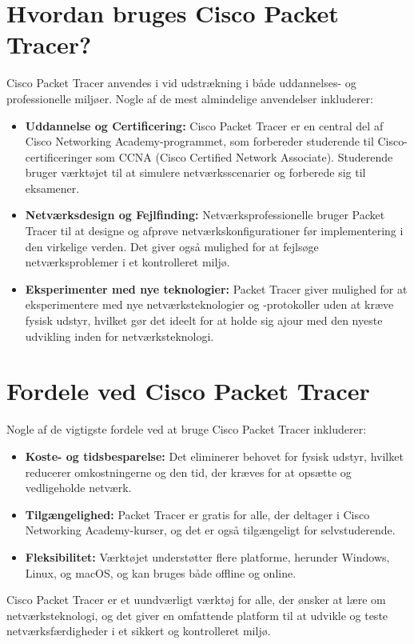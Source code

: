 \section*{Hvordan bruges Cisco Packet Tracer?}
Cisco Packet Tracer anvendes i vid udstrækning i både uddannelses- og professionelle miljøer. Nogle af de mest almindelige anvendelser inkluderer:
\begin{itemize}
	\item \textbf{Uddannelse og Certificering:} Cisco Packet Tracer er en central del af Cisco Networking Academy-programmet, som forbereder studerende til Cisco-certificeringer som CCNA (Cisco Certified Network Associate). Studerende bruger værktøjet til at simulere netværksscenarier og forberede sig til eksamener.
	\item \textbf{Netværksdesign og Fejlfinding:} Netværksprofessionelle bruger Packet Tracer til at designe og afprøve netværkskonfigurationer før implementering i den virkelige verden. Det giver også mulighed for at fejlsøge netværksproblemer i et kontrolleret miljø.
	\item \textbf{Eksperimenter med nye teknologier:} Packet Tracer giver mulighed for at eksperimentere med nye netværksteknologier og -protokoller uden at kræve fysisk udstyr, hvilket gør det ideelt for at holde sig ajour med den nyeste udvikling inden for netværksteknologi.
\end{itemize}

\section*{Fordele ved Cisco Packet Tracer}
Nogle af de vigtigste fordele ved at bruge Cisco Packet Tracer inkluderer:

\begin{itemize}
	\item \textbf{Koste- og tidsbesparelse:} Det eliminerer behovet for fysisk udstyr, hvilket reducerer omkostningerne og den tid, der kræves for at opsætte og vedligeholde netværk.
	\item \textbf{Tilgængelighed:} Packet Tracer er gratis for alle, der deltager i Cisco Networking Academy-kurser, og det er også tilgængeligt for selvstuderende.
	\item \textbf{Fleksibilitet:} Værktøjet understøtter flere platforme, herunder Windows, Linux, og macOS, og kan bruges både offline og online.
\end{itemize}
Cisco Packet Tracer er et uundværligt værktøj for alle, der ønsker at lære om netværksteknologi, og det giver en omfattende platform til at udvikle og teste netværksfærdigheder i et sikkert og kontrolleret miljø.

